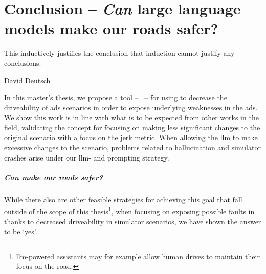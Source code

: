 \chapter{Conclusion -- \emph{Can} large language models make our roads safer?}\label{chp:conclusion}

\epigraph{This inductively justifies the conclusion that induction cannot justify any conclusions.}{David Deutsch}

In this master's thesis, we propose a tool -- \hefe{}~-- for using  to decrease the
driveability of \acrfull{ads} scenarios in order to expose underlying weaknesses in the
\acrshort{ads}. We show this work is in line with what is to be expected from other works in the
field, validating the concept for focusing on making less significant changes to the original
scenario with a focus on the jerk metric. When allowing the \acrshort{llm} to make excessive changes
to the scenario, problems related to hallucination and simulator crashes arise under our
\acrshort{llm}- and prompting strategy.


\paragraph{Can  make our roads safer?} While there also are other feasible strategies
for achieving this goal that fall outside of the scope of this
thesis\footnote{\acrshort{llm}-powered assistants may for example allow human drives to maintain
    their focus on the road.}, when focusing on exposing possible faults in  thanks to
decreased driveability in simulator scenarios, we have shown the answer to be `yes'.